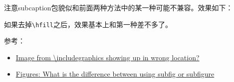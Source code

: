 \documentclass[12pt]{article}
\begin{document}
\begin{Shaded}
\begin{Highlighting}[]
\NormalTok{\{}\NormalTok{\}}
\NormalTok{\{}\NormalTok{\} }

\NormalTok{\{}\NormalTok{\}}
    \NormalTok{[width=0.40}\NormalTok{, height=80pt]\{}\NormalTok{\}}
\NormalTok{\}}
    \NormalTok{[width=0.40}\NormalTok{, height=80pt]\{}\NormalTok{\}}
\NormalTok{\}}
\NormalTok{\{}\NormalTok{\}}
\end{Highlighting}
\end{Shaded}

注意subcaption包貌似和前面两种方法中的某一种可能不兼容。效果如下：

如果去掉\texttt{\textbackslash{}hfill}之后，效果基本上和第一种差不多了。

参考：

\begin{itemize}
\tightlist
\item
  \href{https://tex.stackexchange.com/questions/16207/image-from-includegraphics-showing-up-in-wrong-location}{Image from \textbackslash includegraphics showing up in wrong location?}
\item
  \href{https://tex.stackexchange.com/questions/122314/figures-what-is-the-difference-between-using-subfig-or-subfigure}{Figures: What is the difference between using subfig or subfigure}
\end{itemize}
\end{document}

